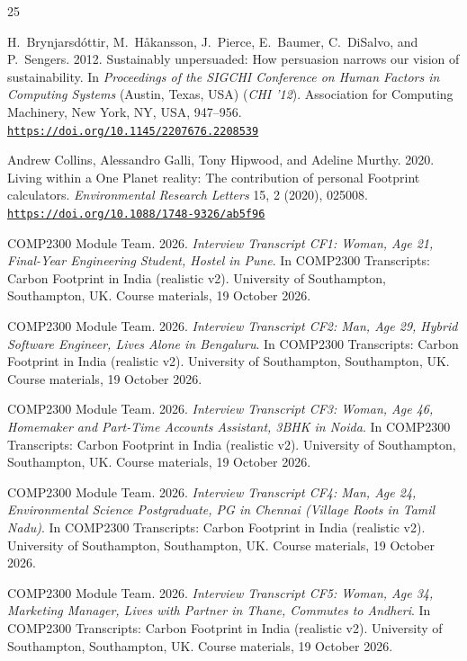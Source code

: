 \documentclass[12pt, a4paper]{article}
\newcommand{\doi}[1]{\href{https://doi.org/#1}{\nolinkurl{https://doi.org/#1}}}
\begin{document}
\begin{thebibliography}{25}

H.~Brynjarsd\'{o}ttir, M.~H\aa kansson, J.~Pierce, E.~Baumer, C.~DiSalvo, and P.~Sengers. 2012. Sustainably unpersuaded: How persuasion narrows our vision of sustainability. In \textit{Proceedings of the SIGCHI Conference on Human Factors in Computing Systems} (Austin, Texas, USA) (\textit{CHI '12}). Association for Computing Machinery, New York, NY, USA, 947--956. \doi{10.1145/2207676.2208539}

Andrew Collins, Alessandro Galli, Tony Hipwood, and Adeline Murthy. 2020. Living within a One Planet reality: The contribution of personal Footprint calculators. \textit{Environmental Research Letters} 15, 2 (2020), 025008. \doi{10.1088/1748-9326/ab5f96}

COMP2300 Module Team. 2026. \textit{Interview Transcript CF1: Woman, Age 21, Final-Year Engineering Student, Hostel in Pune}. In COMP2300 Transcripts: Carbon Footprint in India (realistic v2). University of Southampton, Southampton, UK. Course materials, 19 October 2026.

COMP2300 Module Team. 2026. \textit{Interview Transcript CF2: Man, Age 29, Hybrid Software Engineer, Lives Alone in Bengaluru}. In COMP2300 Transcripts: Carbon Footprint in India (realistic v2). University of Southampton, Southampton, UK. Course materials, 19 October 2026.

COMP2300 Module Team. 2026. \textit{Interview Transcript CF3: Woman, Age 46, Homemaker and Part-Time Accounts Assistant, 3BHK in Noida}. In COMP2300 Transcripts: Carbon Footprint in India (realistic v2). University of Southampton, Southampton, UK. Course materials, 19 October 2026.

COMP2300 Module Team. 2026. \textit{Interview Transcript CF4: Man, Age 24, Environmental Science Postgraduate, PG in Chennai (Village Roots in Tamil Nadu)}. In COMP2300 Transcripts: Carbon Footprint in India (realistic v2). University of Southampton, Southampton, UK. Course materials, 19 October 2026.

COMP2300 Module Team. 2026. \textit{Interview Transcript CF5: Woman, Age 34, Marketing Manager, Lives with Partner in Thane, Commutes to Andheri}. In COMP2300 Transcripts: Carbon Footprint in India (realistic v2). University of Southampton, Southampton, UK. Course materials, 19 October 2026.


\end{thebibliography}
\end{document}
